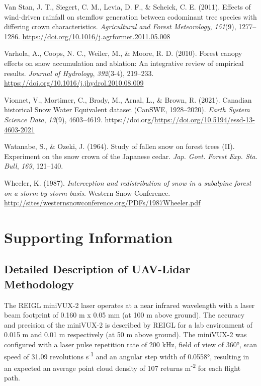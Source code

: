 \documentclass[
  letterpaper,
  DIV=11,
  numbers=noendperiod]{scrartcl}
\newlength{\cslhangindent}
\newenvironment{CSLReferences}[2] %
 {\begin{list}{}{%
  \setlength{\itemindent}{0pt}
  \setlength{\leftmargin}{0pt}
  \setlength{\parsep}{0pt}
  \ifodd #1
   \setlength{\leftmargin}{\cslhangindent}
   \setlength{\itemindent}{-1\cslhangindent}
  \fi
  \setlength{\itemsep}{#2\baselineskip}}}
 {\end{list}}
\begin{document}
\begin{CSLReferences}{1}{0}
Van Stan, J. T., Siegert, C. M., Levia, D. F., \& Scheick, C. E. (2011).
{Effects of wind-driven rainfall on stemflow generation between
codominant tree species with differing crown characteristics}.
\emph{Agricultural and Forest Meteorology}, \emph{151}(9), 1277--1286.
\url{https://doi.org/10.1016/j.agrformet.2011.05.008}

Varhola, A., Coops, N. C., Weiler, M., \& Moore, R. D. (2010). {Forest
canopy effects on snow accumulation and ablation: An integrative review
of empirical results}. \emph{Journal of Hydrology}, \emph{392}(3-4),
219--233. \url{https://doi.org/10.1016/j.jhydrol.2010.08.009}

Vionnet, V., Mortimer, C., Brady, M., Arnal, L., \& Brown, R. (2021).
{Canadian historical Snow Water Equivalent dataset (CanSWE,
1928--2020)}. \emph{Earth System Science Data}, \emph{13}(9),
4603--4619.
https://doi.org/\url{https://doi.org/10.5194/essd-13-4603-2021}

Watanabe, S., \& Ozeki, J. (1964). {Study of fallen snow on forest trees
(II). Experiment on the snow crown of the Japanese cedar}. \emph{Jap.
Govt. Forest Exp. Sta. Bull}, \emph{169}, 121--140.

Wheeler, K. (1987). \emph{{Interception and redistribution of snow in a
subalpine forest on a storm-by-storm basis}}. Western Snow Conference.
\url{http://sites/westernsnowconference.org/PDFs/1987Wheeler.pdf}

\end{CSLReferences}

\section{Supporting Information}\label{supporting-information}

\subsection{Detailed Description of UAV-Lidar
Methodology}\label{detailed-description-of-uav-lidar-methodology}

The REIGL miniVUX-2 laser operates at a near infrared wavelength with a
laser beam footprint of 0.160 m x 0.05 mm (at 100 m above ground). The
accuracy and precision of the miniVUX-2 is described by REIGL for a lab
environment of 0.015 m and 0.01 m respectively (at 50 m above ground).
The miniVUX-2 was configured with a laser pulse repetition rate of 200
kHz, field of view of 360°, scan speed of 31.09 revolutions
s\textsuperscript{-1} and an angular step width of 0.0558°, resulting in
an expected an average point cloud density of 107 returns
m\textsuperscript{-2} for each flight path.
\end{document}
